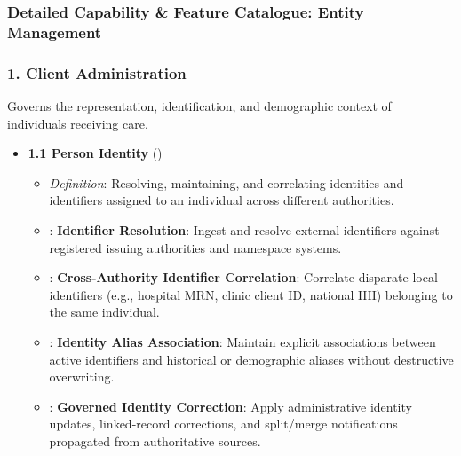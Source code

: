 \label{rad:enabling:110}
\subsubsection*{Detailed Capability \& Feature Catalogue: Entity Management}
\label{rad:enabling:112}
\subsubsection*{1. Client Administration}
\label{rad:enabling:113}

Governs the representation, identification, and demographic context of individuals receiving care.

\label{rad:enabling:115}

\begin{itemize}

\item
\textbf{1.1 Person Identity} (\texttt{})


\begin{itemize}

\item
\emph{Definition}: Resolving, maintaining, and correlating identities and identifiers assigned to an individual across different authorities.



\item
\texttt{}: \textbf{Identifier Resolution}: Ingest and resolve external identifiers against registered issuing authorities and namespace systems.



\item
\texttt{}: \textbf{Cross-Authority Identifier Correlation}: Correlate disparate local identifiers (e.g., hospital MRN, clinic client ID, national IHI) belonging to the same individual.



\item
\texttt{}: \textbf{Identity Alias Association}: Maintain explicit associations between active identifiers and historical or demographic aliases without destructive overwriting.



\item
\texttt{}: \textbf{Governed Identity Correction}: Apply administrative identity updates, linked-record corrections, and split/\allowbreak{}merge notifications propagated from authoritative sources.




\end{itemize}
\end{itemize}
